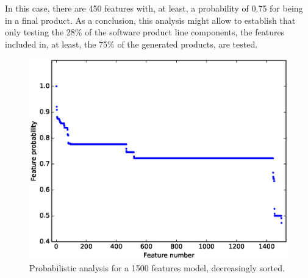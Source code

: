 In this case, there are 450 features with, at least, a probability of 0.75 for being in a final product. As a conclusion, 
this analysis might allow to establish that only testing the 28\% of the software product line components, the features
included in, at least, the 75\% of the generated products, are tested.

\begin{figure}[h]
	\centering
	\linefigure
	\includegraphics[width=0.8\hsize,angle=0]{plot_probs_probs_sorted.eps}
	\linefigure
	\caption{Probabilistic analysis for a 1500 features model, decreasingly sorted.}\label{fig:plot:probs:probs:sorted}
\end{figure}



